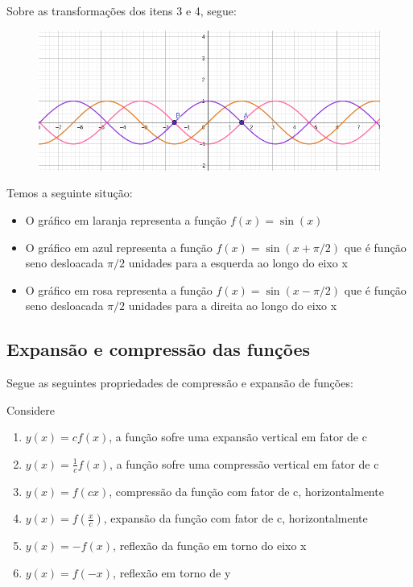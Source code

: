 \begin{multicols*}{2}
    Sobre as transformações dos itens 3 e 4, segue:
    \begin{figure}[H]
        \centering
        \includegraphics[scale=0.25]{assets/rafael/img8.png}
    \end{figure}
    Temos a seguinte situção:
    \begin{itemize}
        \item O gráfico em laranja representa a função $f(x) = \sin(x)$
        \item O gráfico em azul representa a função $f(x) = \sin(x + \pi/2)$ que é função seno 							desloacada $\pi/2$ unidades para a esquerda ao longo do eixo x
        \item O gráfico em rosa representa a função $f(x) = \sin(x - \pi/2)$ que é função seno 							desloacada $\pi/2$ unidades para a direita ao longo do eixo x
    \end{itemize}
    \subsection{Expansão e compressão das funções}
    Segue as seguintes propriedades de compressão e expansão de funções:

    Considere
    \begin{enumerate}
        \item $y(x) = cf(x)$, a função sofre uma expansão vertical em fator de c
        \item $y(x) = \frac{1}{c} f(x)$, a função sofre uma compressão vertical em fator de c
        \item $ y(x) = f(cx)$, compressão da função com fator de c, horizontalmente
        \item $y(x) = f(\frac{x}{c})$, expansão da função com fator de c, horizontalmente
        \item $y(x) = -f(x)$, reflexão da função em torno do eixo x
        \item $y(x)  = f(-x)$, reflexão em torno de y
    \end{enumerate}


\end{multicols*}
